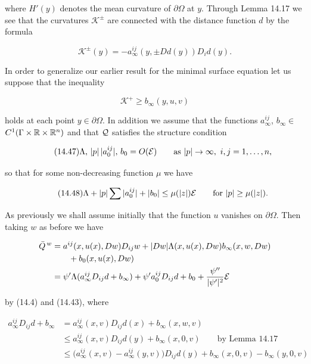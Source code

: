 

where $H'(y)$ denotes the mean curvature of $\partial\Omega$ at $y$. Through Lemma 14.17 we see
that the curvatures $\mathcal{K}^{\pm}$ are connected with the distance function $d$ by the formula

\begin{equation}
\tag{14.45}
\mathcal{K}^{\pm}(y)=-a^{ij}_{\infty}(y,\pm Dd(y))D_{i}d(y).
\end{equation}

In order to generalize our earlier result for the minimal surface equation let us
suppose that the inequality

\begin{equation}
\tag{14.46}
\mathcal{K}^{+}\ge b_{\infty}(y,u,v)
\end{equation}

holds at each point $y\in\partial\Omega$. In addition we assume that the functions $a^{ij}_{\infty}$, $b_{\infty}\in$
$C^{1}(\Gamma\times\mathbb{R}\times\mathbb{R}^{n})$ and that $\mathcal{Q}$ satisfies the structure condition

\begin{equation}
\tag{14.47}
\Lambda,\, |p|\,|a^{ij}_{0}|,\, b_{0}=O(\mathcal{E}) \qquad \text{as } |p|\to\infty,\ i,j=1,\ldots,n,
\end{equation}

so that for some non-decreasing function $\mu$ we have

\begin{equation}
\tag{14.48}
\Lambda+|p|\sum |a^{ij}_{0}|+|b_{0}|\le \mu(|z|)\mathcal{E} \qquad \text{for } |p|\ge \mu(|z|).
\end{equation}

As previously we shall assume initially that the function $u$ vanishes on $\partial\Omega$. Then
taking $w$ as before we have

\begin{align*}
\bar{Q}^{\,w}
&=a^{ij}(x,u(x),Dw)D_{ij}w+|Dw|\Lambda(x,u(x),Dw)b_{\infty}(x,w,Dw) \\
&\qquad +b_{0}(x,u(x),Dw) \\
&=\psi'\Lambda(a^{ij}_{\infty}D_{ij}d+b_{\infty})+\psi'a^{ij}_{0}D_{ij}d+b_{0}+\frac{\psi''}{|\psi'|^{2}}\mathcal{E}
\end{align*}

by (14.4) and (14.43), where

\begin{align*}
a^{ij}_{\infty}D_{ij}d+b_{\infty}
&=a^{ij}_{\infty}(x,v)D_{ij}d(x)+b_{\infty}(x,w,v) \\
&\le a^{ij}_{\infty}(x,v)D_{ij}d(y)+b_{\infty}(x,0,v) \qquad \text{by Lemma 14.17} \\
&\le \bigl(a^{ij}_{\infty}(x,v)-a^{ij}_{\infty}(y,v)\bigr)D_{ij}d(y)+b_{\infty}(x,0,v)-b_{\infty}(y,0,v)
\end{align*}

